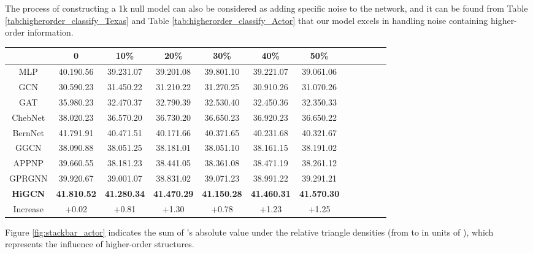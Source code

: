 \documentclass[letterpaper]{article} \usepackage{aaai24}
\newcommand \spm[1] {\footnotesize{#1} }
\theoremstyle{plain}
\theoremstyle{definition}
\theoremstyle{remark}
\begin{document}
The process of constructing a 1k null model can also be considered as adding specific noise to the network, and it can be found from Table \ref{tab:higherorder_classify_Texas} and Table \ref{tab:higherorder_classify_Actor} that our model excels in handling noise containing higher-order information.


\begin{table*}[!ht] 
\centering
\begin{tabular}{cccccccccccc}\toprule
    &0   &10\%   &20\%   &30\%  &40\%  &50\%\\
\midrule
MLP
&40.19\spm{0.56}  &39.23\spm{1.07}  &39.20\spm{1.08}  &39.80\spm{1.10}  &39.22\spm{1.07}  &39.06\spm{1.06}\\
GCN      
&30.59\spm{0.23}  &31.45\spm{0.22}  &31.21\spm{0.22}  &31.27\spm{0.25}  &30.91\spm{0.26}  &31.07\spm{0.26}\\
GAT      
&35.98\spm{0.23}  &32.47\spm{0.37}  &32.79\spm{0.39}  &32.53\spm{0.40}  &32.45\spm{0.36}  &32.35\spm{0.33}\\
ChebNet  
&38.02\spm{0.23}  &36.57\spm{0.20}  &36.73\spm{0.20}  &36.65\spm{0.23}  &36.92\spm{0.23}  &36.65\spm{0.22}\\
BernNet  
&41.79\spm{1.91}  &40.47\spm{1.51}  &40.17\spm{1.66}  &40.37\spm{1.65}  &40.23\spm{1.68}  &40.32\spm{1.67}\\
GGCN  
&38.09\spm{0.88}  &38.05\spm{1.25}  &38.18\spm{1.01}  &38.05\spm{1.10}  &38.16\spm{1.15}  &38.19\spm{1.02}\\
APPNP  
&39.66\spm{0.55}  &38.18\spm{1.23}  &38.44\spm{1.05}  &38.36\spm{1.08}  &38.47\spm{1.19}  &38.26\spm{1.12}\\
GPRGNN 
&39.92\spm{0.67}  &39.00\spm{1.07}  &38.83\spm{1.02}  &39.07\spm{1.23}  &38.99\spm{1.22}  &39.29\spm{1.21}\\
\midrule
\textbf{HiGCN}
&\textbf{41.81\spm{0.52}}  &\textbf{41.28\spm{0.34}}  &\textbf{41.47\spm{0.29}}  &\textbf{41.15\spm{0.28}}  &\textbf{41.46\spm{0.31}} &\textbf{41.57\spm{0.30}}\\
\midrule
Increase
&+0.02  &+0.81  &+1.30  &+0.78  &+1.23 &+1.25\\
\bottomrule
\end{tabular}
\caption{Node classification results on Actor with changeable higher-order densities: mean accuracy  confidence interval. Bold values indicate the best result.}
\label{tab:higherorder_classify_Actor}
\end{table*}


Figure \ref{fig:stackbar_actor} indicates the sum of 's absolute value under the relative triangle densities (from  to  in units of ), which represents the influence of higher-order structures.
\end{document}
